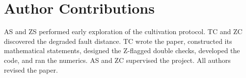\section{Author Contributions}
AS and ZS performed early exploration of the cultivation protocol.
TC and ZC discovered the degraded fault distance.
TC wrote the paper,
constructed its mathematical statements,
designed the Z-flagged double checks,
developed the code,
and ran the numerics.
AS and ZC supervised the project.
All authors revised the paper.